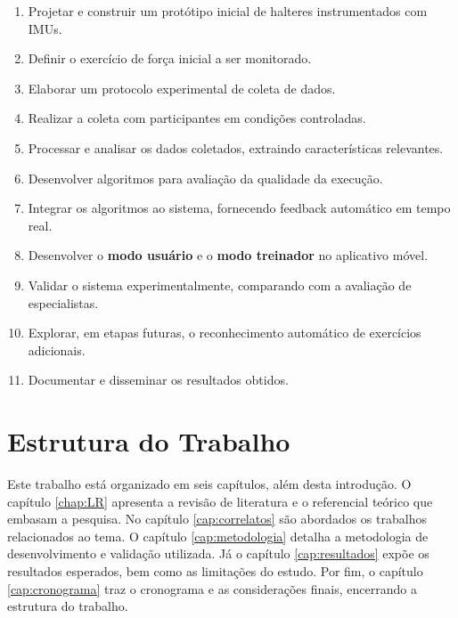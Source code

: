 \begin{enumerate}
    \item Projetar e construir um protótipo inicial de halteres instrumentados com IMUs.  
    \item Definir o exercício de força inicial a ser monitorado.  
    \item Elaborar um protocolo experimental de coleta de dados.  
    \item Realizar a coleta com participantes em condições controladas.  
    \item Processar e analisar os dados coletados, extraindo características relevantes.  
    \item Desenvolver algoritmos para avaliação da qualidade da execução.  
    \item Integrar os algoritmos ao sistema, fornecendo feedback automático em tempo real.  
    \item Desenvolver o \textbf{modo usuário} e o \textbf{modo treinador} no aplicativo móvel.  
    \item Validar o sistema experimentalmente, comparando com a avaliação de especialistas.  
    \item Explorar, em etapas futuras, o reconhecimento automático de exercícios adicionais.  
    \item Documentar e disseminar os resultados obtidos.  
\end{enumerate}

\section{Estrutura do Trabalho}

Este trabalho está organizado em seis capítulos, além desta introdução. O capítulo \ref{chap:LR} apresenta a revisão de literatura e o referencial teórico que embasam a pesquisa. No capítulo \ref{cap:correlatos} são abordados os trabalhos relacionados ao tema. O capítulo \ref{cap:metodologia} detalha a metodologia de desenvolvimento e validação utilizada. Já o capítulo \ref{cap:resultados} expõe os resultados esperados, bem como as limitações do estudo. Por fim, o capítulo \ref{cap:cronograma} traz o cronograma e as considerações finais, encerrando a estrutura do trabalho.
